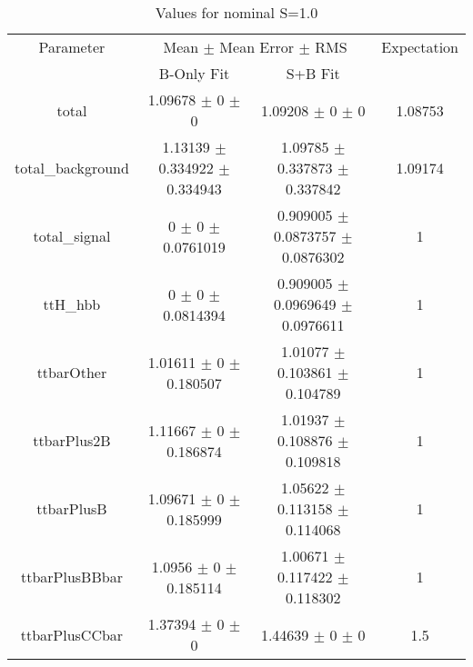 \begin{table}
\centering
\caption{Values for nominal S=1.0}
\begin{tabular}{cccc}
\toprule
Parameter & \multicolumn{2}{c}{Mean $\pm$ Mean Error $\pm$ RMS} & Expectation\\
 & B-Only Fit & S+B Fit & \\
\midrule
total & \num{1.09678} $\pm$ \num{0} $\pm$ \num{0} & \num{1.09208} $\pm$ \num{0} $\pm$ \num{0} & \num{1.08753}\\
total\_background & \num{1.13139} $\pm$ \num{0.334922} $\pm$ \num{0.334943} & \num{1.09785} $\pm$ \num{0.337873} $\pm$ \num{0.337842} & \num{1.09174}\\
total\_signal & \num{0} $\pm$ \num{0} $\pm$ \num{0.0761019} & \num{0.909005} $\pm$ \num{0.0873757} $\pm$ \num{0.0876302} & \num{1}\\
ttH\_hbb & \num{0} $\pm$ \num{0} $\pm$ \num{0.0814394} & \num{0.909005} $\pm$ \num{0.0969649} $\pm$ \num{0.0976611} & \num{1}\\
ttbarOther & \num{1.01611} $\pm$ \num{0} $\pm$ \num{0.180507} & \num{1.01077} $\pm$ \num{0.103861} $\pm$ \num{0.104789} & \num{1}\\
ttbarPlus2B & \num{1.11667} $\pm$ \num{0} $\pm$ \num{0.186874} & \num{1.01937} $\pm$ \num{0.108876} $\pm$ \num{0.109818} & \num{1}\\
ttbarPlusB & \num{1.09671} $\pm$ \num{0} $\pm$ \num{0.185999} & \num{1.05622} $\pm$ \num{0.113158} $\pm$ \num{0.114068} & \num{1}\\
ttbarPlusBBbar & \num{1.0956} $\pm$ \num{0} $\pm$ \num{0.185114} & \num{1.00671} $\pm$ \num{0.117422} $\pm$ \num{0.118302} & \num{1}\\
ttbarPlusCCbar & \num{1.37394} $\pm$ \num{0} $\pm$ \num{0} & \num{1.44639} $\pm$ \num{0} $\pm$ \num{0} & \num{1.5}\\
\bottomrule
\end{tabular}
\end{table}